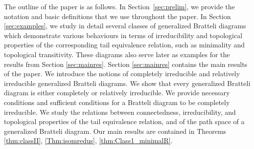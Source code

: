 \documentclass[11pt, twoside]{amsart}
\theoremstyle{definition}
\theoremstyle{remark}
\theoremstyle{plain}
\newcommand{\tcb}{\textcolor{blue}}
\newcommand{\tcr}{\textcolor{red}}
\numberwithin{equation}{section}
\begin{document}



The outline of the paper is as follows. In Section~\ref{sec:prelim}, we provide the notation and basic definitions that we  use throughout the paper. In Section \ref{sec:examples}, we study in detail several classes of generalized Bratteli diagrams which demonstrate various behaviours in terms of irreducibility and topological properties of the corresponding tail equivalence relation, such as minimality and topological transitivity. These diagrams also
serve later as examples for the results from Section \ref{sec:mainres}. Section \ref{sec:mainres} contains the main results of the paper. We introduce the notions of completely irreducible and relatively irreducible generalized Bratteli diagrams. We show that every generalized Bratteli diagram is either completely or relatively irreducible. We provide necessary conditions and sufficient conditions for a Bratteli diagram to be completely irreducible. %
We study the relations between connectedness, irreducibility, and topological properties of the tail equivalence relation, and of the path space of a generalized Bratteli diagram.
Our main results are contained in Theorems \ref{thm:classII}, \ref{Thm:isomredus}, \ref{thm:Class1_minimalR}.






\end{document}
